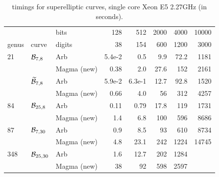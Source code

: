 \documentclass[main.tex]{subfiles}
\begin{document}
  \begin{table}[H]
      \begin{center}
          \begin{tabular}{lllrrrrr}
              \toprule
              & & \hfill bits & 128 & 512 & 2000 & 4000 & 10000 \\
              genus & curve & \hfill digits & 38 & 154 & 600 & 1200 & 3000 \\
              \midrule
              21 & $\mathcal{B}_{7,8}$
              & Arb & 5.4e-2 & 0.5 & 9.9 & 72.2 & 1181 \\
              & & Magma (new) & 0.38 & 2.0 & 27.6 & 152 & 2161 \\
              \cmidrule{3-8}
              & $\widetilde{\mathcal{B}}_{7,8}$
              & Arb & 5.9e-2 & 6.3e-1 & 12.7 & 92.8 & 1520 \\
              & & Magma (new) & 0.66 & 4.0 & 56 & 312 & 4257 \\
              \midrule
              84 & $\mathcal{B}_{25,8}$
              & Arb & 0.11 & 0.79 & 17.8 & 119 & 1731 \\
              & & Magma (new) & 1.4 & 6.8 & 100 & 596 & 8686 \\
              \midrule
              87 & $\mathcal{B}_{7,30}$
              & Arb & 0.9 & 8.5 & 93 & 610 & 8734 \\
              & & Magma (new) & 4.8 & 23.1 & 242 & 1224 & 14745 \\
              \midrule
              348 & $\mathcal{B}_{25,30}$
              & Arb & 1.6 & 12.7 & 202 & 1284 \\
              & & Magma (new) & 38 & 92 & 598 & 2597 \\
              \bottomrule
          \end{tabular}
          \caption{timings for superelliptic curves, single core Xeon E5 2.27GHz (in seconds).}
      \end{center}
  \end{table}


  \biblio
  
\end{document}
